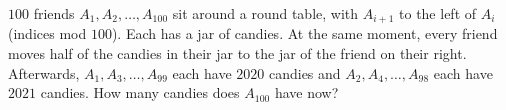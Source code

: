 $100$ friends $A_1,A_2,\dots,A_{100}$ sit around a round table, with $A_{i+1}$ to the left of $A_i$ (indices mod $100$). Each has a jar of candies. At the same moment, every friend moves half of the candies in their jar to the jar of the friend on their right. Afterwards, $A_1,A_3,\dots,A_{99}$ each have $2020$ candies and $A_2,A_4,\dots,A_{98}$ each have $2021$ candies. How many candies does $A_{100}$ have now?
